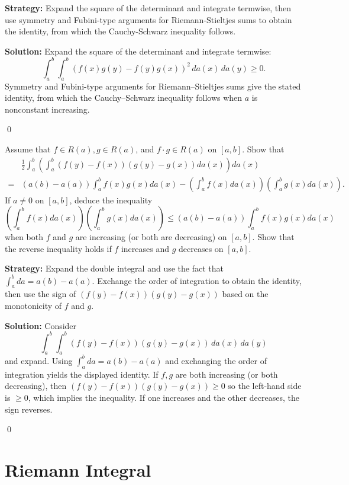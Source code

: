 \noindent\textbf{Strategy:} Expand the square of the determinant and integrate termwise, then use symmetry and Fubini-type arguments for Riemann-Stieltjes sums to obtain the identity, from which the Cauchy-Schwarz inequality follows.

\bigskip\noindent\textbf{Solution:}
Expand the square of the determinant and integrate termwise:
\[\int_a^b\int_a^b (f(x)g(y)-f(y)g(x))^2\,da(x)\,da(y)\ge 0.
\]
Symmetry and Fubini-type arguments for Riemann–Stieltjes sums give the stated identity, from which the Cauchy–Schwarz inequality follows when $a$ is nonconstant increasing.




\qed
\begin{problembox}
\begin{problemstatement}
Assume that $f \in R(a), g \in R(a)$, and $f \cdot g \in R(a)$ on $[a, b]$. Show that
\begin{align*}
&\frac{1}{2} \int_a^b \left( \int_a^b (f(y) - f(x))(g(y) - g(x)) da(x) \right) da(x) \\
=& (a(b) - a(a)) \int_a^b f(x)g(x) da(x) - \left( \int_a^b f(x) da(x) \right) \left( \int_a^b g(x) da(x) \right).
\end{align*}
If $a \neq 0$ on $[a, b]$, deduce the inequality
\[\left( \int_a^b f(x) da(x) \right) \left( \int_a^b g(x) da(x) \right) \leq (a(b) - a(a)) \int_a^b f(x)g(x) da(x)\]
when both $f$ and $g$ are increasing (or both are decreasing) on $[a, b]$. Show that the reverse inequality holds if $f$ increases and $g$ decreases on $[a, b]$.
\end{problemstatement}
\end{problembox}

\noindent\textbf{Strategy:} Expand the double integral and use the fact that $\int_a^b da = a(b) - a(a)$. Exchange the order of integration to obtain the identity, then use the sign of $(f(y) - f(x))(g(y) - g(x))$ based on the monotonicity of $f$ and $g$.

\bigskip\noindent\textbf{Solution:}
Consider
\[\int_a^b\int_a^b (f(y)-f(x))(g(y)-g(x))\,da(x)\,da(y)\]
and expand. Using $\int_a^b da=a(b)-a(a)$ and exchanging the order of integration yields the displayed identity. If $f,g$ are both increasing (or both decreasing), then $(f(y)-f(x))(g(y)-g(x))\ge0$ so the left-hand side is $\ge0$, which implies the inequality. If one increases and the other decreases, the sign reverses.


\qed
\section{Riemann Integral}

